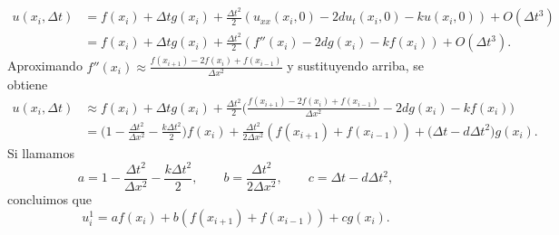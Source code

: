 \documentclass[a4paper, 11pt, oneside]{report}
\begin{document}
\begin{align*}
    u(x_i,\Delta t) &= f(x_i)+\Delta t g(x_i) + \frac{\Delta t^2}{2}(u_{xx}(x_i,0)-2du_t(x_i,0)-ku(x_i,0))+O(\Delta t^3) \\
    &= f(x_i)+\Delta t g(x_i) + \frac{\Delta t^2}{2}(f''(x_i)-2dg(x_i)-kf(x_i))+O(\Delta t^3).
\end{align*}
Aproximando $f''(x_i) \approx \frac{f(x_{i+1})-2f(x_i)+f(x_{i-1})}{\Delta x^2}$ y sustituyendo arriba, se obtiene
\begin{align*}
    u(x_i,\Delta t) &\approx f(x_i)+\Delta t g(x_i) + \frac{\Delta t^2}{2}\bigl(\frac{f(x_{i+1})-2f(x_i)+f(x_{i-1})}{\Delta x^2}-2dg(x_i)-kf(x_i)\bigr) \\
    &= \bigl(1-\frac{\Delta t^2}{\Delta x^2}- \frac{k\Delta t^2}{2}\bigr)f(x_i) + \frac{\Delta t^2}{2\Delta x^2}(f(x_{i+1})+f(x_{i-1})) + \bigl(\Delta t - d\Delta t^2\bigr)g(x_i).
\end{align*}
Si llamamos
\[a = 1-\frac{\Delta t^2}{\Delta x^2} - \frac{k\Delta t^2}{2}, \qquad b = \frac{\Delta t^2}{2\Delta x^2}, \qquad c = \Delta t - d\Delta t^2,\]
concluimos que
\[u_i^1 = af(x_i)+b(f(x_{i+1})+f(x_{i-1}))+cg(x_i).\]
\end{document}
